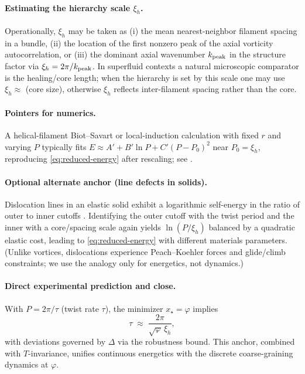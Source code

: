 \documentclass[11pt]{article}
\theoremstyle{remark}
\theoremstyle{definition}
\begin{document}
\paragraph{Estimating the hierarchy scale $\xi_h$.}
Operationally, $\xi_h$ may be taken as (i) the mean nearest-neighbor filament spacing in a bundle, (ii) the location of the first nonzero peak of the axial vorticity autocorrelation, or (iii) the dominant axial wavenumber $k_{\rm peak}$ in the structure factor via $\xi_h=2\pi/k_{\rm peak}$. In superfluid contexts a natural microscopic comparator is the healing/core length; when the hierarchy is set by this scale one may use $\xi_h\approx$ (core size), otherwise $\xi_h$ reflects inter-filament spacing rather than the core.

\paragraph{Pointers for numerics.}
A helical-filament Biot–Savart or local-induction calculation with fixed $r$ and varying $P$ typically fits $E \approx A' + B'\ln P + C'(P-P_0)^2$ near $P_0=\xi_h$, reproducing \cref{eq:reduced-energy} after rescaling; see \cite{Widnall1972,Hardin1982,FukumotoOkulov2005,Betchov1965,KleinMajdaDamodaran1995}.

\paragraph{Optional alternate anchor (line defects in solids).}
Dislocation lines in an elastic solid exhibit a logarithmic self-energy in the ratio of outer to inner cutoffs \cite{HirthLothe}. Identifying the outer cutoff with the twist period and the inner with a core/spacing scale again yields $\ln(P/\xi_h)$ balanced by a quadratic elastic cost, leading to \cref{eq:reduced-energy} with different materials parameters. (Unlike vortices, dislocations experience Peach–Koehler forces and glide/climb constraints; we use the analogy only for energetics, not dynamics.)

\paragraph{Direct experimental prediction and close.}
With $P=2\pi/\tau$ (twist rate $\tau$), the minimizer $x_\star=\varphi$ implies
\[
\tau \;\approx\; \frac{2\pi}{\sqrt{\varphi}\,\xi_h},
\]
with deviations governed by $\Delta$ via the robustness bound. This anchor, combined with $T$-invariance, unifies continuous energetics with the discrete coarse-graining dynamics at $\varphi$.
\end{document}

